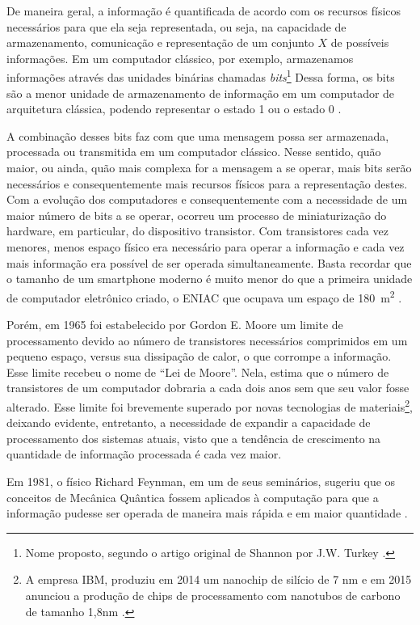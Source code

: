 \documentclass[12pt,oneside,brazil,hidelinks,article,sumario=tradicional,a4paper]{abntex2}
\begin{document}
De maneira geral, a informação é quantificada de acordo com os recursos físicos necessários para que ela seja representada, ou seja, na capacidade de armazenamento, comunicação e representação de um conjunto $X$ de possíveis informações. Em um computador clássico, por exemplo, armazenamos informações através das unidades binárias chamadas \textit{bits}\footnote{Nome proposto, segundo o artigo original de Shannon por J.W. Turkey \cite{MTC}.} Dessa forma, os bits são a menor unidade de armazenamento de informação em um computador de arquitetura clássica, podendo representar o estado 1 ou o estado 0 \cite{MTC}.

A combinação desses bits faz com que uma mensagem possa ser armazenada, processada ou transmitida em um computador clássico. Nesse sentido, quão maior, ou ainda, quão mais complexa for a mensagem a se operar, mais bits serão necessários e consequentemente mais recursos físicos para a representação destes. Com a evolução dos computadores e consequentemente com a necessidade de um maior número de bits a se operar, ocorreu um processo de miniaturização do hardware, em particular, do dispositivo transistor. Com transistores cada vez menores, menos espaço físico era necessário para operar a informação e cada vez mais informação era possível de ser operada simultaneamente. Basta recordar que o tamanho de um smartphone moderno é muito menor do que a primeira unidade de computador eletrônico criado, o ENIAC que ocupava um espaço de \SI{180}{\square\meter} \cite{eniac}.

Porém, em 1965 foi estabelecido por Gordon E. Moore um limite de processamento devido ao número de transistores necessários comprimidos em um pequeno espaço, versus sua dissipação de calor, o que corrompe a informação. Esse limite recebeu o nome de ``Lei de Moore''. Nela, \textcite{moore} estima que o número de transistores de um computador dobraria a cada dois anos sem que seu valor fosse alterado. Esse limite foi brevemente superado por novas tecnologias de materiais\footnote{A empresa IBM, produziu em 2014 um nanochip de silício de 7 nm e em 2015 anunciou a produção de chips de processamento com nanotubos de carbono de tamanho 1,8nm \cite{chipibm}.}, deixando evidente, entretanto, a necessidade de expandir a capacidade de processamento dos sistemas atuais, visto que a tendência de crescimento na quantidade de informação processada é cada vez maior.

Em 1981, o físico Richard Feynman, em um de seus seminários, sugeriu que os conceitos de Mecânica Quântica fossem aplicados à computação para que a informação pudesse ser operada de maneira mais rápida e em maior quantidade \cite{TeoQuanInfoEntreCopia}.
\end{document}
